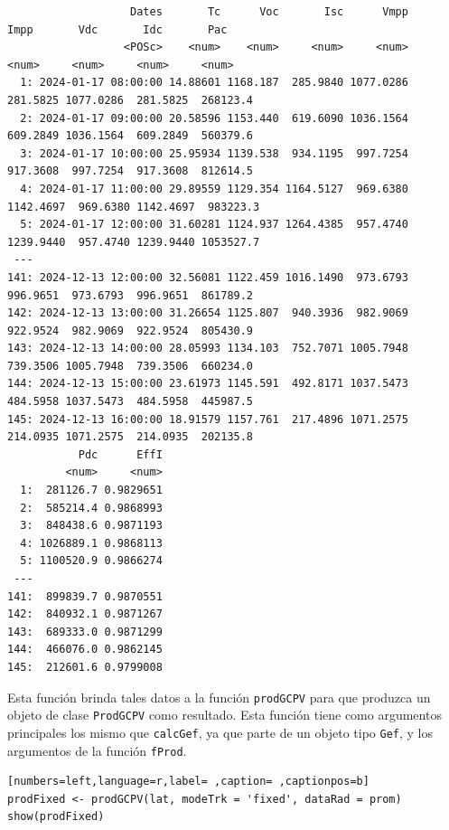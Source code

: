 \begin{verbatim}
                   Dates       Tc      Voc       Isc      Vmpp      Impp       Vdc       Idc       Pac
                  <POSc>    <num>    <num>     <num>     <num>     <num>     <num>     <num>     <num>
  1: 2024-01-17 08:00:00 14.88601 1168.187  285.9840 1077.0286  281.5825 1077.0286  281.5825  268123.4
  2: 2024-01-17 09:00:00 20.58596 1153.440  619.6090 1036.1564  609.2849 1036.1564  609.2849  560379.6
  3: 2024-01-17 10:00:00 25.95934 1139.538  934.1195  997.7254  917.3608  997.7254  917.3608  812614.5
  4: 2024-01-17 11:00:00 29.89559 1129.354 1164.5127  969.6380 1142.4697  969.6380 1142.4697  983223.3
  5: 2024-01-17 12:00:00 31.60281 1124.937 1264.4385  957.4740 1239.9440  957.4740 1239.9440 1053527.7
 ---                                                                                                  
141: 2024-12-13 12:00:00 32.56081 1122.459 1016.1490  973.6793  996.9651  973.6793  996.9651  861789.2
142: 2024-12-13 13:00:00 31.26654 1125.807  940.3936  982.9069  922.9524  982.9069  922.9524  805430.9
143: 2024-12-13 14:00:00 28.05993 1134.103  752.7071 1005.7948  739.3506 1005.7948  739.3506  660234.0
144: 2024-12-13 15:00:00 23.61973 1145.591  492.8171 1037.5473  484.5958 1037.5473  484.5958  445987.5
145: 2024-12-13 16:00:00 18.91579 1157.761  217.4896 1071.2575  214.0935 1071.2575  214.0935  202135.8
           Pdc      EffI
         <num>     <num>
  1:  281126.7 0.9829651
  2:  585214.4 0.9868993
  3:  848438.6 0.9871193
  4: 1026889.1 0.9868113
  5: 1100520.9 0.9866274
 ---                    
141:  899839.7 0.9870551
142:  840932.1 0.9871267
143:  689333.0 0.9871299
144:  466076.0 0.9862145
145:  212601.6 0.9799008
\end{verbatim}

Esta función brinda tales datos a la función \texttt{prodGCPV} para que produzca un objeto de clase \texttt{ProdGCPV} como resultado. Esta función tiene como argumentos principales los mismo que \texttt{calcGef}, ya que parte de un objeto tipo \texttt{Gef}, y los argumentos de la función \texttt{fProd}.
\begin{lstlisting}[numbers=left,language=r,label= ,caption= ,captionpos=b]
prodFixed <- prodGCPV(lat, modeTrk = 'fixed', dataRad = prom)
show(prodFixed)
\end{lstlisting}

